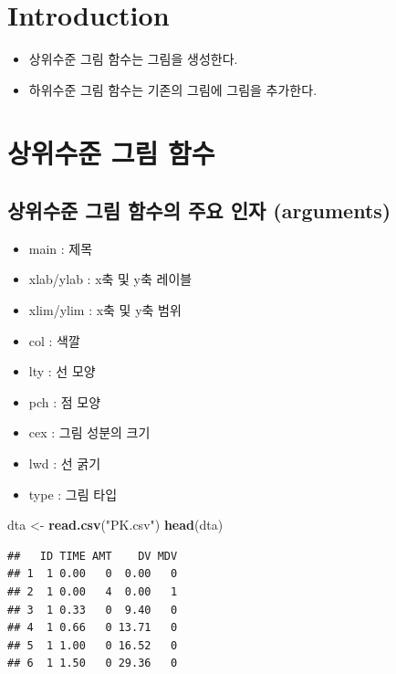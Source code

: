 \documentclass[11pt,]{krantz}
\makeatletter
\newenvironment{Shaded}{\begin{snugshade}}{\end{snugshade}}
\newcommand{\KeywordTok}[1]{\textcolor[rgb]{0.13,0.29,0.53}{\textbf{#1}}}
\newcommand{\StringTok}[1]{\textcolor[rgb]{0.31,0.60,0.02}{#1}}
\newcommand{\NormalTok}[1]{#1}
\providecommand{\tightlist}{%
  \setlength{\itemsep}{0pt}\setlength{\parskip}{0pt}}
\newenvironment{kframe}{%
\medskip{}
\setlength{\fboxsep}{.8em}
 \def\at@end@of@kframe{}%
 \ifinner\ifhmode%
  \def\at@end@of@kframe{\end{minipage}}%
  \begin{minipage}{\columnwidth}%
 \fi\fi%
 \def\FrameCommand##1{\hskip\@totalleftmargin \hskip-\fboxsep
 \colorbox{shadecolor}{##1}\hskip-\fboxsep
     \hskip-\linewidth \hskip-\@totalleftmargin \hskip\columnwidth}%
 \MakeFramed {\advance\hsize-\width
   \@totalleftmargin\z@ \linewidth\hsize
   \@setminipage}}%
 {\par\unskip\endMakeFramed%
 \at@end@of@kframe}
\renewenvironment{Shaded}{\begin{kframe}}{\end{kframe}}
\theoremstyle{definition}
\theoremstyle{definition}
\theoremstyle{remark}
\makeatother
\begin{document}
\section{Introduction}\label{introduction}

\begin{itemize}
\tightlist
\item
  상위수준 그림 함수는 그림을 생성한다.
\item
  하위수준 그림 함수는 기존의 그림에 그림을 추가한다.
\end{itemize}

\section{상위수준 그림 함수}\label{upper}

\subsection{상위수준 그림 함수의 주요 인자
(arguments)}\label{-----arguments}

\begin{itemize}
\tightlist
\item
  main : 제목
\item
  xlab/ylab : x축 및 y축 레이블
\item
  xlim/ylim : x축 및 y축 범위
\item
  col : 색깔
\item
  lty : 선 모양
\item
  pch : 점 모양
\item
  cex : 그림 성분의 크기
\item
  lwd : 선 굵기
\item
  type : 그림 타입
\end{itemize}

\begin{Shaded}
\begin{Highlighting}[]
\NormalTok{dta <-}\StringTok{ }\KeywordTok{read.csv}\NormalTok{(}\StringTok{"PK.csv"}\NormalTok{)}
\KeywordTok{head}\NormalTok{(dta)}
\end{Highlighting}
\end{Shaded}

\begin{verbatim}
##   ID TIME AMT    DV MDV
## 1  1 0.00   0  0.00   0
## 2  1 0.00   4  0.00   1
## 3  1 0.33   0  9.40   0
## 4  1 0.66   0 13.71   0
## 5  1 1.00   0 16.52   0
## 6  1 1.50   0 29.36   0
\end{verbatim}
\end{document}

